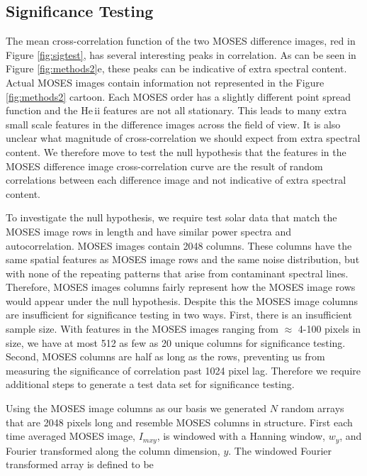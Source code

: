 	
	\subsection{Significance Testing}\label{sec:sigtesting}
	
		The mean cross-correlation function of the two MOSES difference images, red in Figure \ref{fig:sigtest}, has several interesting peaks in correlation.  
		As can be seen in Figure \ref{fig:methods2}e, these peaks can be indicative of extra spectral content.  
		Actual MOSES images contain information not represented in the Figure \ref{fig:methods2} cartoon.  
		Each MOSES order has a slightly different point spread function and the He\,{\sc ii} features are not all stationary.  
		This leads to many extra small scale features in the difference images across the field of view.  
		It is also unclear what magnitude of cross-correlation we should expect from extra spectral content.  
		We therefore move to test the null hypothesis that the features in the MOSES difference image cross-correlation curve are the result of random correlations between each difference image and not indicative of extra spectral content.  
		
		
		To investigate the null hypothesis, we require test solar data that match the MOSES image rows in length and have similar power spectra and  autocorrelation.  
		MOSES images contain 2048 columns.  
		These columns have the same spatial features as MOSES image rows and the same noise distribution, but with none of the repeating patterns that arise from contaminant spectral lines.
		Therefore, MOSES images columns fairly represent how the MOSES image rows would appear under the null hypothesis.
		Despite this the MOSES image columns are insufficient for significance testing in two ways.  
		First, there is an insufficient sample size.
		With features in the MOSES images ranging from $\approx$ 4-100 pixels in size, we have at most 512 as few as 20 unique columns for significance testing.  
		Second, MOSES columns are half as long as the rows, preventing us from measuring the significance of correlation past 1024 pixel lag.  
		Therefore we require additional steps to generate a test data set for significance testing.
	
		Using the MOSES image columns as our basis we generated $N$ random arrays that are 2048 pixels long and resemble MOSES columns in structure.  
		First each time averaged MOSES image, $I_{mxy}$, is windowed with a Hanning window, $w_y$, and Fourier transformed along the column dimension, $y$.  
		The windowed Fourier transformed array is defined to be
	
